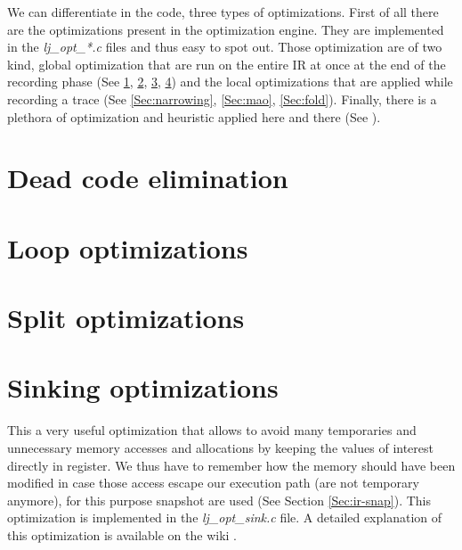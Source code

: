 
We can differentiate in the code, three types of optimizations.
First of all there are the optimizations present in the optimization engine.
They are implemented in the \emph{lj\_opt\_*.c} files and thus easy to spot out.
Those optimization are of two kind, global optimization that are run on the
entire IR at once at the end of the recording phase (See \ref{Sec:opt-dce}, \ref{Sec:opt-loop}, \ref{Sec:opt-split}, \ref{Sec:opt-sinking}) and the local
optimizations that are applied while recording a trace (See \ref{Sec:narrowing},
\ref{Sec:mao}, \ref{Sec:fold}).
Finally, there is a plethora of optimization and heuristic applied here and
there (See ).

\section{Dead code elimination}
\label{Sec:opt-dce}

\section{Loop optimizations}
\label{Sec:opt-loop}

\section{Split optimizations}
\label{Sec:opt-split}

\section{Sinking optimizations}
\label{Sec:opt-sinking}
This a very useful optimization that allows to avoid many temporaries and
unnecessary memory accesses and allocations by keeping the values of interest
directly in register. We thus have to remember how the memory should have been
modified in case those access escape our execution path (are not temporary
anymore), for this purpose snapshot are used (See Section \ref{Sec:ir-snap}). This optimization is implemented
in the \emph{lj\_opt\_sink.c} file. A detailed explanation of this optimization
is available on the wiki \cite{luajit-sink}.



